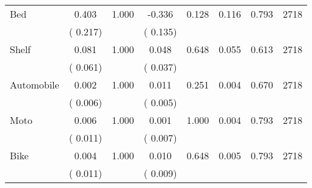 \begin{tabular}{l*{7}{c}}
 Bed       &              0.403       &        1.000  &             -0.336       &        0.128  &              0.116       &              0.793 &  2718 \\ 
                       &       (       0.217)             &                               &       (       0.135)                     &                               &                                               &                                &                      \\ 

 Shelf       &              0.081       &        1.000  &              0.048       &        0.648  &              0.055       &              0.613 &  2718 \\ 
                       &       (       0.061)             &                               &       (       0.037)                     &                               &                                               &                                &                      \\ 

 Automobile       &              0.002       &        1.000  &              0.011       &        0.251  &              0.004       &              0.670 &  2718 \\ 
                       &       (       0.006)             &                               &       (       0.005)                     &                               &                                               &                                &                      \\ 

 Moto       &              0.006       &        1.000  &              0.001       &        1.000  &              0.004       &              0.793 &  2718 \\ 
                       &       (       0.011)             &                               &       (       0.007)                     &                               &                                               &                                &                      \\ 

 Bike       &              0.004       &        1.000  &              0.010       &        0.648  &              0.005       &              0.793 &  2718 \\ 
                       &       (       0.011)             &                               &       (       0.009)                     &                               &                                               &                                &                      \\ 


\end{tabular}

